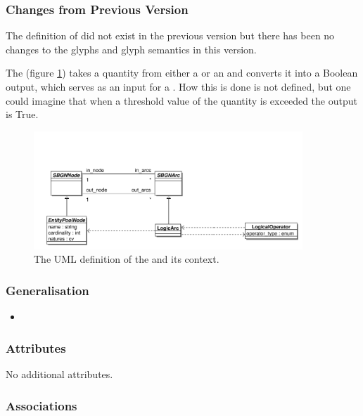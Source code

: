 \subsubsection{Changes from Previous Version}

The definition of  did not exist in the
previous version but there has been no changes to the glyphs and glyph
semantics in this version.

\label{defn:LogicArc}

The  (figure \ref{fig:techref:logicarcuml}) takes a quantity from either a
 or an  and
converts it into a Boolean output, which serves as an input for a
. How this is done is not defined, but one
could imagine that when a threshold value of the quantity is exceeded
the output is True.

\begin{figure}[htb]
  \centering
  \includegraphics[width = 0.9\textwidth]{images/logicarcuml}
  \caption{The UML definition of the  and its context.}
  \label{fig:techref:logicarcuml}
\end{figure}

\subsubsection{Generalisation}

\begin{itemize}
\item {}
\end{itemize}

\subsubsection{Attributes}

No additional attributes.

\subsubsection{Associations}

